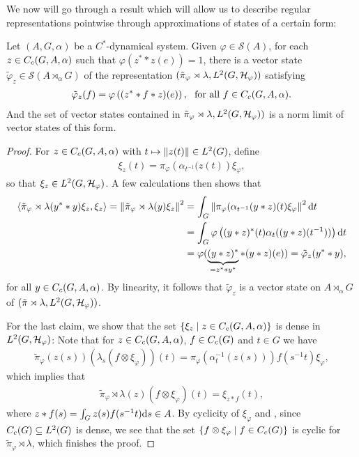 We now will go through a result which will allow us to describe regular representations pointwise through approximations of states of a certain form:
\begin{proposition}
	Let $(A,G,\alpha)$ be a $C^*$-dynamical system. Given $\varphi \in \mathcal{S}(A)$, for each $z \in C_c(G,A,\alpha)$ such that $\varphi(z^* \ast z(e)) = 1$, there is a vector state $\tilde \varphi_z \in \mathcal{S}(A \rtimes_\alpha G)$ of the representation $(\tilde \pi_{\varphi} \rtimes \lambda , L^2(G,\mathcal{H}_\varphi))$ satisfying
	\begin{align*}
		\tilde \varphi_z (f) =\varphi\left( (z^* \ast f \ast z)(e) \right), \ \text{ for all } f \in C_c(G,A,\alpha).
	\end{align*}
	And the set of vector states contained in $\tilde \pi_{\varphi} \rtimes \lambda , L^2(G,\mathcal{H}_\varphi))$ is a norm limit of vector states of this form.
	\label{mult:vectorstateapprox}
\end{proposition}
\begin{proof}
	For $z \in C_c(G,A,\alpha)$ with $t \mapsto \left\lVert z(t) \right\rVert \in L^2(G)$, define
	\begin{align*}
		\xi_z(t) = \pi_{\varphi}\left( \alpha_{t^{-1}}(z(t) \right)\xi_\varphi,
	\end{align*}
	so that $\xi_z \in L^2(G,\mathcal{H}_\varphi)$. A few calculations then shows that 
	\begin{align*}
		\langle \tilde \pi_\varphi \rtimes \lambda (y^* \ast y) \xi_z , \xi_z \rangle  = \left\lVert \tilde \pi_\varphi \rtimes \lambda(y) \xi_z \right\rVert ^2 &= \int_G \left\lVert  \pi_\varphi ( \alpha_{t^{-1}}(y \ast z)(t) \xi_\varphi \right\rVert^2 \mathrm{d} t \\
		&=\int_G \varphi\left( (y \ast z)^*(t) \alpha_t( (y \ast z)( t^{-1}) ) \right) \mathrm{d} t \\
		&= \varphi ( \underbrace{(y  \ast z )^*}_{= z^* \ast y^*} \ast (y \ast z) (e)) = \tilde\varphi_{z} (y^* \ast y),
	\end{align*}
	for all $y \in C_c(G,A,\alpha)$. By linearity, it follows that $\tilde \varphi_z$ is a vector state on $A \rtimes_\alpha G$ of $(\tilde \pi \rtimes \lambda, L^2(G,\mathcal{H}_\varphi))$.
	
	For the last claim, we show that the set $\{ \xi_z \mid z \in C_c(G,A,\alpha)\}$ is dense in $L^2(G,\mathcal{H}_\varphi)$: Note that for $z \in C_c(G,A,\alpha)$, $f \in C_c(G)$ and $t \in G$ we have
	\begin{align*}
		\tilde \pi_\varphi(z(s)) (\lambda_s (f \otimes \xi_\varphi))(t) = \pi_\varphi(\alpha_t^{-1}(z(s)))f(s^{-1}t) \xi_\varphi,
	\end{align*}
	which implies that 
	\begin{align*}
		\tilde \pi_\varphi \rtimes \lambda (z) (f \otimes \xi_\varphi) (t) = \xi_{z \ast f}(t),
	\end{align*}
	where $z \ast f(s) = \int_G z(s) f(s^{-1}t) \mathrm{d} s \in A$.  By cyclicity of $\xi_\varphi$ and , since $C_c(G) \subseteq L^2(G)$ is dense, we see that the set $\{ f \otimes \xi_\varphi \mid f \in C_c(G)\}$ is cyclic for $\tilde \pi_\varphi \rtimes \lambda$, which finishes the proof.
\end{proof}


